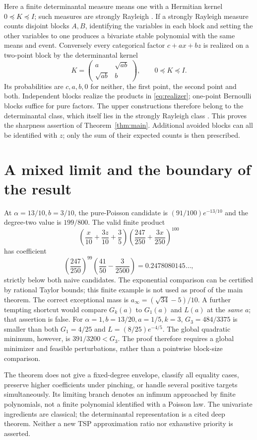 \documentclass[11pt]{article}
\begin{document}
Here a finite determinantal measure means one with a Hermitian kernel
$0\preceq K\preceq I$; such measures are strongly Rayleigh
\cite[Proposition 3.5]{BBL}.
If a strongly Rayleigh measure counts disjoint blocks $A,B$, identifying
the variables in each block and setting the other variables to one
produces a bivariate stable polynomial with the same means and event.
Conversely every categorical factor $c+ax+bz$ is realized on a two-point
block by the determinantal kernel
\[
 K=\begin{pmatrix}a&\sqrt{ab}\\\sqrt{ab}&b\end{pmatrix},
 \qquad 0\preceq K\preceq I.
\]
Its probabilities are $c,a,b,0$ for neither, the first point, the second
point and both. Independent blocks realize the products in
\eqref{eq:realizer}; one-point Bernoulli blocks suffice for pure factors.
The upper constructions therefore belong to the determinantal class,
which itself lies in the strongly Rayleigh class \cite{BBL}.
This proves the sharpness assertion of Theorem~\ref{thm:main}.
Additional avoided blocks can all be identified with $z$; only the sum
of their expected counts is then prescribed.

\section{A mixed limit and the boundary of the result}\label{sec:example}
At $\alpha=13/10,b=3/10$, the pure-Poisson candidate is
$(91/100)e^{-13/10}$ and the degree-two value is $199/800$.
The valid finite product
\[
 \left(\frac{x}{10}+\frac{3z}{10}+\frac35\right)
 \left(\frac{247}{250}+\frac{3x}{250}\right)^{100}
\]
has coefficient
\[
 \left(\frac{247}{250}\right)^{99}
 \left(\frac{41}{50}-\frac3{2500}\right)
 =0.2478080145\ldots,
\]
strictly below both naive candidates. The exponential comparison can
be certified by rational Taylor bounds; this finite example is not
used as proof of the main theorem. The correct exceptional mass is
$a_\infty=(\sqrt{34}-5)/10$.
A further tempting shortcut would compare $G_k(a)$ to $G_1(a)$ and
$L(a)$ at the \emph{same} $a$; that assertion is false. For
$\alpha=1,b=13/20,a=1/5,k=3$,
$G_3=484/3375$ is smaller than both $G_1=4/25$ and
$L=(8/25)e^{-4/5}$. The global quadratic minimum, however, is
$391/3200<G_3$. The proof therefore requires a global minimizer and
feasible perturbations, rather than a pointwise block-size comparison.

The theorem does not give a fixed-degree envelope, classify all equality
cases, preserve higher coefficients under pinching, or handle several
positive targets simultaneously. Its limiting branch denotes an
infimum approached by finite polynomials, not a finite polynomial
identified with a Poisson law. The univariate ingredients are classical;
the determinantal representation is a cited deep theorem. Neither a
new TSP approximation ratio nor exhaustive priority is asserted.
\end{document}
